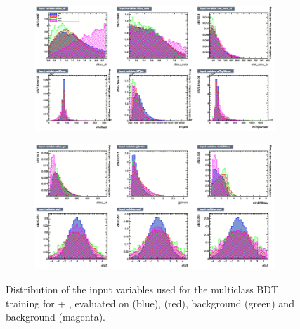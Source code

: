 \begin{figure}[htbp]
  \centering
  \begin{subfigure}{0.95\linewidth}
    \centering
    \includegraphics[width=\linewidth]{images/plots_tH_tHqb_for_thesis/variables_id_c1.png}
  \end{subfigure}
  \vspace{0.5cm} %
  \begin{subfigure}{0.95\linewidth}
    \centering
    \includegraphics[width=\linewidth]{images/plots_tH_tHqb_for_thesis/variables_id_c2.png}
  \end{subfigure}
  \caption{Distribution of the input variables used for the multiclass BDT training for \thtt + \ttHtt, evaluated on \ttHtt (blue), \thtt (red), \ztautau background (green) and \ttbar background (magenta).}
  \label{th_tth_vars_tmva_1}
  \end{figure}


